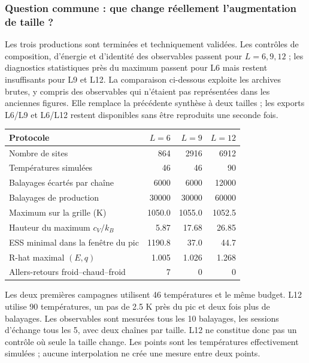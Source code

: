 \subsubsection{Question commune : que change réellement l’augmentation de taille ?}

Les trois productions sont terminées et techniquement validées. Les contrôles de composition, d’énergie et d’identité des observables passent pour $L=6,9,12$ ; les diagnostics statistiques près du maximum passent pour L6 mais restent insuffisants pour L9 et L12. La comparaison ci-dessous exploite les archives brutes, y compris des observables qui n’étaient pas représentées dans les anciennes figures. Elle remplace la précédente synthèse à deux tailles ; les exports L6/L9 et L6/L12 restent disponibles sans être reproduits une seconde fois.

\begin{center}\small\begin{tabular}{lrrr}\toprule

Protocole & $L=6$ & $L=9$ & $L=12$\\\midrule

Nombre de sites & 864 & 2916 & 6912\\

Températures simulées & 46 & 46 & 90\\

Balayages écartés par chaîne & 6000 & 6000 & 12000\\

Balayages de production & 30000 & 30000 & 60000\\

Maximum sur la grille (K) & 1050.0 & 1055.0 & 1052.5\\

Hauteur du maximum $c_V/k_B$ & 5.87 & 17.68 & 26.85\\

ESS minimal dans la fenêtre du pic & 1190.8 & 37.0 & 44.7\\

R-hat maximal $(E,q)$ & 1.005 & 1.026 & 1.268\\

Allers-retours froid--chaud--froid & 7 & 0 & 0\\

\bottomrule\end{tabular}\end{center}

Les deux premières campagnes utilisent 46 températures et le même budget. L12 utilise 90 températures, un pas de 2.5 K près du pic et deux fois plus de balayages. Les observables sont mesurées tous les 10 balayages, les sessions d’échange tous les 5, avec deux chaînes par taille. L12 ne constitue donc pas un contrôle où seule la taille change. Les points sont les températures effectivement simulées ; aucune interpolation ne crée une mesure entre deux points.

